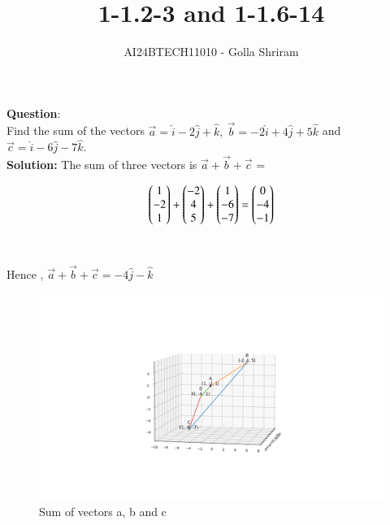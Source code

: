 \documentclass[journal]{IEEEtran}
\begin{document}

\vspace{3cm}

\title{1-1.2-3 and 1-1.6-14}
\author{AI24BTECH11010  - Golla Shriram
}
{\let\newpage\relax\maketitle}

\renewcommand{\thefigure}{\theenumi}
\renewcommand{\thetable}{\theenumi}
\setlength{\intextsep}{10pt} %


\renewcommand{\thetable}{\theenumi}


\textbf{Question}:\\
     Find the sum of the vectors $\vec{a} = \hat{i}-2\hat{j}+\hat{k} ,\ \vec{b} = -2\hat{i}+4\hat{j}+5\hat{k}$  and  $ \vec{c} = \hat{i}-6\hat{j}-7\hat{k}. $
\\
\textbf{Solution: }
  The sum of three vectors is $\vec{a} + \vec{b} + \vec{c}$  =

\begin{align}
	\begin{pmatrix}
    1   \\
   -2 \\
	 1\end{pmatrix}
+  \begin{pmatrix}
    -2    \\
    4\\
  5\end{pmatrix}+ \begin{pmatrix}
     1
   \\
  -6
   \\
    -7\end{pmatrix}
   = \begin{pmatrix}
    0 \\
    -4	\\-1\end{pmatrix}
\end{align}\\ \\
  Hence , $ \vec{a}   +   \vec{b}+   \vec{c} =  -4\hat{j}-\hat{k}  $



  \begin{figure}[h!]
   \centering
   \includegraphics[width=0.6\linewidth]{figs/image.png}
	  \caption{ Sum of vectors a, b and c }
   \label{stemplot}
\end{figure}
\newpage
\end{document}
